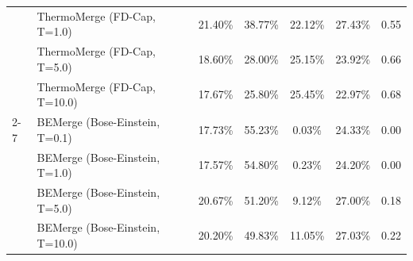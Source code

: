 \documentclass{article}
\theoremstyle{plain}
\theoremstyle{definition}
\theoremstyle{remark}
\begin{document}
\begin{table}[h]
\begin{center}
\begin{footnotesize}
\begin{tabular}{llccccc}
             & ThermoMerge (FD-Cap, T=1.0) & 21.40\% & 38.77\% & 22.12\% & 27.43\% & 0.55 \\
             & ThermoMerge (FD-Cap, T=5.0) & 18.60\% & 28.00\% & 25.15\% & 23.92\% & 0.66 \\
             & ThermoMerge (FD-Cap, T=10.0) & 17.67\% & 25.80\% & 25.45\% & 22.97\% & 0.68 \\
\cmidrule{2-7}
             & BEMerge (Bose-Einstein, T=0.1) & 17.73\% & 55.23\% & 0.03\% & 24.33\% & 0.00 \\
             & BEMerge (Bose-Einstein, T=1.0) & 17.57\% & 54.80\% & 0.23\% & 24.20\% & 0.00 \\
             & BEMerge (Bose-Einstein, T=5.0) & 20.67\% & 51.20\% & 9.12\% & 27.00\% & 0.18 \\
             & BEMerge (Bose-Einstein, T=10.0) & 20.20\% & 49.83\% & 11.05\% & 27.03\% & 0.22 \\
\bottomrule
\end{tabular}
\end{footnotesize}
\end{center}
\vskip -0.15in
\end{table}
\end{document}
